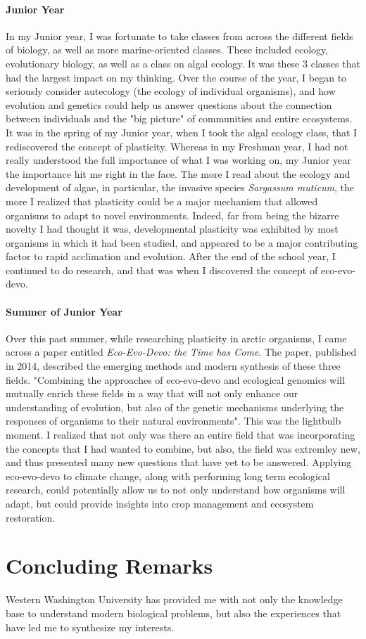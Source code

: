 \documentclass[letterpaper]{article}
\begin{document}
\paragraph{Junior Year}
In my Junior year, I was fortunate to take classes from across the different fields of biology, as well as more marine-oriented classes. These included ecology, evolutionary biology,
as well as a class on algal ecology. It was these 3 classes that had the largest impact on my thinking. 
Over the course of the year, I began to seriously consider autecology (the ecology of individual organisms), and how evolution and genetics could help us answer questions about the connection between individuals and the "big picture" of communities and 
entire ecosystems. It was in the spring of my Junior year, when I took the algal ecology class, that I rediscovered the concept of plasticity. Whereas in my Freshman year,
I had not really understood the full importance of what I was working on,  my Junior year the importance hit me right in the face. The more I read about the ecology and development of algae, in particular, the invasive species
\textit{Sargassum muticum}, the more I realized that plasticity could be a major mechanism that allowed organisms to adapt to novel environments. Indeed, far from being the bizarre novelty I had thought it was, developmental plasticity was exhibited by most organisms in which it had been studied,
and appeared to be a major contributing factor to rapid acclimation and evolution. After the end of the school year, I continued to do research, and that was when I discovered the concept of eco-evo-devo.
\paragraph{Summer of Junior Year}
Over this past summer, while researching plasticity in arctic organisms, I came across a paper entitled \textit{Eco-Evo-Devo: the Time has Come}. The paper, published in 2014, described the emerging methods and modern synthesis of these three fields.
 "Combining the approaches of eco-evo-devo and ecological genomics will mutually enrich these fields in a way that will not only enhance our understanding of evolution, but also of the genetic mechanisms underlying the responses of organisms to their 
 natural environments".
This was the lightbulb moment. I realized that not only was there an entire field that was incorporating the concepts that I had wanted to combine, but also, the field was extremley new, and thus presented many new questions that
have yet to be answered. Applying eco-evo-devo to climate change, along with performing long term ecological research, could potentially allow us to not only understand how organisms will adapt, but could provide insights into crop management and ecosystem restoration.

\section*{Concluding Remarks}
Western Washington University has provided me with not only the knowledge base to understand modern biological problems, but also the experiences that have led me to synthesize my interests.  
\end{document}

